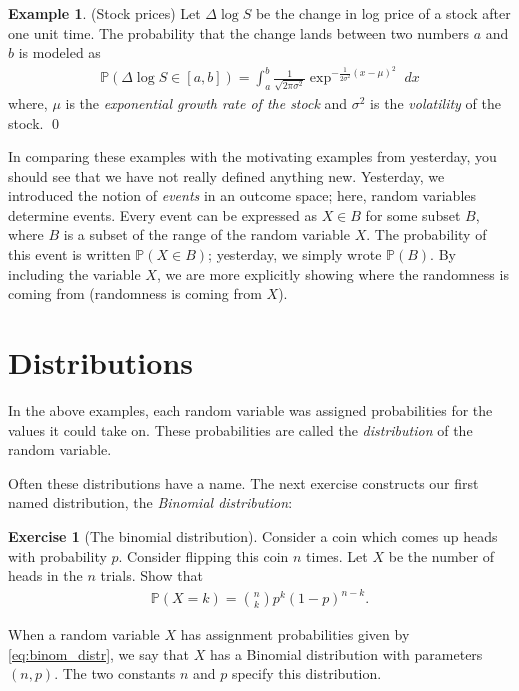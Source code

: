 \documentclass[11pt]{article}
\theoremstyle{definition}
\newtheorem{example}[theorem]{Example}
\newtheorem{exercise}[]{Exercise}
\renewcommand{\P}{\mathbb{P}}
\begin{document}
\begin{example}(Stock prices)
  \label{ex:log_stocks}
  Let $\Delta \log S$ be the change in log price of a stock after one unit time.
  The probability that the change lands between two numbers $a$ and $b$ is modeled
  as
  \begin{align}
    \P(\Delta \log S \in [a, b]) = \int_a^b \frac{1}{\sqrt{2\pi\sigma^2}}
    \exp^{-\frac{1}{2\sigma^2}(x - \mu)^2} \; dx
    \label{eq:normal_ex}
  \end{align}
  where, $\mu$ is the \textit{exponential growth rate of the stock}
  and $\sigma^2$ is the \textit{volatility} of the stock.
\qed
\end{example}

In comparing these examples with the motivating
examples from yesterday, you should see that
we have not really defined anything new.
Yesterday, we introduced the notion of \textit{events}
in an outcome space; here, random variables
determine events.
Every event can be expressed as $X\in B$ for some subset $B$, where
$B$ is a subset of the range of the random variable $X$.
The probability of this event is written
$\P(X\in B)$; yesterday, we simply wrote $\P(B)$.
By including the variable $X$, we are more
explicitly showing where the randomness is coming from
(randomness is coming from $X$).

\section{Distributions}

In the above examples, each random variable was assigned probabilities for
the values it could take on. These probabilities are called the
\textit{distribution} of the random variable.

Often these distributions have a name. The next exercise constructs our
first named distribution, the \textit{Binomial distribution}:

\begin{exercise}[The binomial distribution]
Consider a coin which comes up heads with probability $p$.
Consider flipping this coin $n$ times. Let $X$ be the number of
heads in the $n$ trials. Show that
\begin{align}
\P(X = k) = {n \choose k} p^k (1 - p)^{n - k}.
\label{eq:binom_distr}
\end{align}

\end{exercise}

When a random variable $X$ has assignment probabilities given by \eqref{eq:binom_distr},
we say that $X$ has a Binomial distribution with parameters $(n, p)$. The two constants
$n$ and $p$ specify this distribution.
\end{document}
